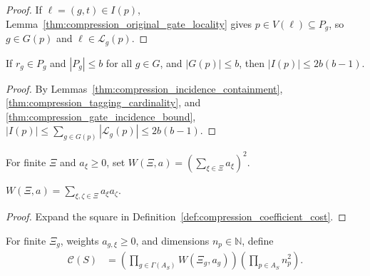 \begin{proof}\leanok
    If $\ell=(g,t)\in I(p)$, Lemma~\ref{thm:compression_original_gate_locality} gives $p\in V(\ell)\subseteq P_g$, so $g\in G(p)$ and $\ell\in\mathcal L_g(p)$.
\end{proof}

\begin{lemma}
    \label{thm:compression_distributed_incidence_bound}
    \leanok
    If $r_g\in P_g$ and $|P_g|\le b$ for all $g\in G$, and $|G(p)|\le b$, then $|I(p)|\le2b(b-1)$.
\end{lemma}

\begin{proof}\leanok
    By Lemmas~\ref{thm:compression_incidence_containment}, \ref{thm:compression_tagging_cardinality}, and \ref{thm:compression_gate_incidence_bound}, $|I(p)|\le\sum_{g\in G(p)}|\mathcal L_g(p)|\le2b(b-1)$.
\end{proof}

\begin{definition}
    \label{def:compression_coefficient_cost}
    \leanok
    For finite $\Xi$ and $a_\xi\ge0$, set $W(\Xi,a)=(\sum_{\xi\in\Xi}a_\xi)^2$.
\end{definition}

\begin{lemma}
    \label{thm:compression_double_coefficient_sum}
    \leanok
    $W(\Xi,a)=\sum_{\xi,\zeta\in\Xi}a_\xi a_\zeta$.
\end{lemma}

\begin{proof}\leanok
    Expand the square in Definition~\ref{def:compression_coefficient_cost}.
\end{proof}

\begin{definition}
    \label{def:compression_position_choice_cost}
    \leanok
    For finite $\Xi_g$, weights $a_{g,\xi}\ge0$, and dimensions $n_p\in\mathbb N$, define
    \begin{align}
        \mathcal C(S) & =\left(\prod_{g\in\Gamma(A_S)}W(\Xi_g,a_g)\right)\left(\prod_{p\in A_S}n_p^2\right).
        \label{eq:compression_incidence_choice_cost}
    \end{align}
\end{definition}

